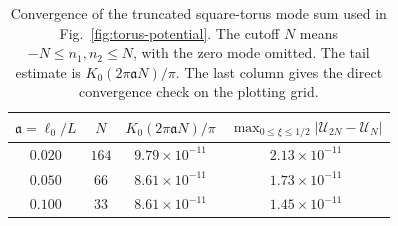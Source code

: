\documentclass[openacc]{rsproca_new}%
\begin{document}
\begin{table}[t]
\caption{Convergence of the truncated square-torus mode sum used in Fig.~\ref{fig:torus-potential}. The cutoff \(N\) means \(-N\leq n_1,n_2\leq N\), with the zero mode omitted. The tail estimate is \(K_0(2\pi\mathfrak a N)/\pi\). The last column gives the direct convergence check on the plotting grid.}
\label{tab:torus-convergence}
\begin{tabular}{cccc}
\hline
\(\mathfrak a=\ell_0/L\) &
\(N\) &
\(K_0(2\pi\mathfrak a N)/\pi\) &
\(\displaystyle{\max_{0\leq\xi\leq 1/2}} |\mathcal U_{2N}-\mathcal U_N|\) \\
\hline
\(0.020\) & \(164\) & \(9.79\times10^{-11}\) & \(2.13\times10^{-11}\) \\
\(0.050\) & \(66\)  & \(8.61\times10^{-11}\) & \(1.73\times10^{-11}\) \\
\(0.100\) & \(33\)  & \(8.61\times10^{-11}\) & \(1.45\times10^{-11}\) \\
\hline
\end{tabular}
\end{table}
\end{document}
